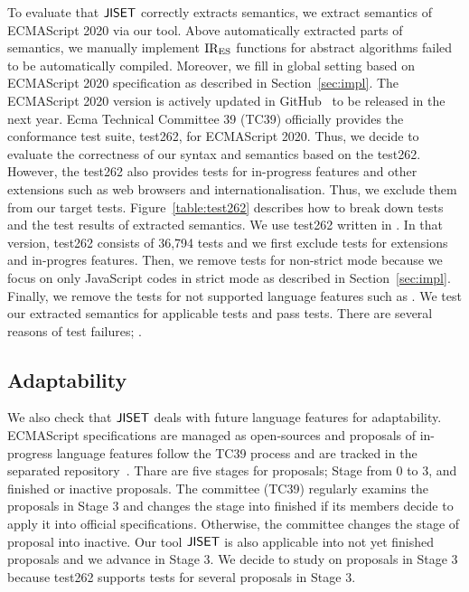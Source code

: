 To evaluate that \( \text{\sf JISET} \) correctly extracts semantics, we extract semantics of ECMAScript
2020 via our tool. Above automatically extracted parts of semantics, we manually implement
 \( \text{IR}_\text{ES} \) functions for abstract algorithms failed to be automatically compiled.
Moreover, we fill in global setting based on ECMAScript 2020 specification as described
in Section~\ref{sec:impl}. The ECMAScript 2020 version is actively updated in
GitHub~\cite{es2020} to be released in the next year. Ecma Technical Committee 39 (TC39)
officially provides the conformance test suite, test262, for ECMAScript 2020.
Thus, we decide to evaluate the correctness of our syntax and semantics based on the test262.
However, the test262 also provides tests for in-progress features and other extensions
such as web browsers and internationalisation. Thus, we exclude them from our target tests.
Figure~\ref{table:test262} describes how to break down tests and the test results of extracted
semantics. We use test262 written in . In that version,
test262 consists of 36,794 tests and we first exclude  tests
for extensions and in-progres features. Then, we remove tests for non-strict mode because
we focus on only JavaScript codes in strict mode
as described in Section~\ref{sec:impl}. Finally, we remove the  tests
for not supported language features such as .
We test our extracted semantics for  applicable tests and pass  tests.
There are several reasons of test failures; .

\subsection{Adaptability}

We also check that \( \text{\sf JISET} \) deals with future language features for adaptability.
ECMAScript specifications are managed as open-sources and proposals of in-progress language
features follow the TC39 process and are tracked in the separated repository~\cite{proposals}.
Thare are five stages for proposals; Stage from 0 to 3, and finished or inactive proposals.
The committee (TC39) regularly examins the proposals in Stage 3 and changes the stage into
finished if its members decide to apply it into official specifications. Otherwise, the committee
changes the stage of proposal into inactive. Our tool \( \text{\sf JISET} \) is also applicable into
not yet finished proposals and we advance  in Stage 3.
We decide to study on proposals in Stage 3 because test262 supports tests for several
proposals in Stage 3.

